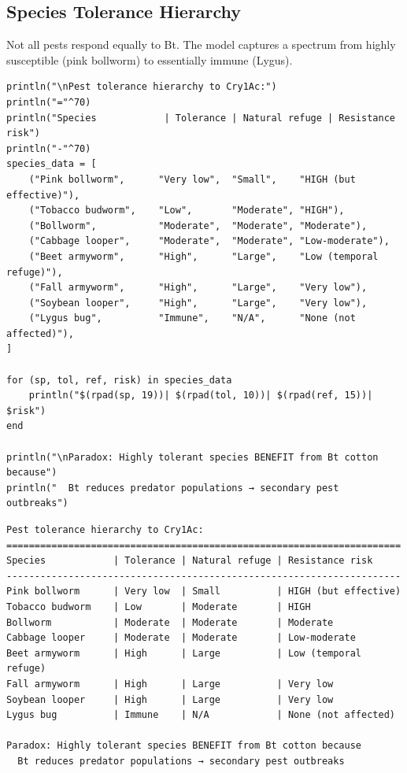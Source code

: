 \subsection{Species Tolerance Hierarchy}



\label{3927424312920648016}{}


Not all pests respond equally to Bt. The model captures a spectrum from highly susceptible (pink bollworm) to essentially immune (Lygus).




\begin{verbatim}
println("\nPest tolerance hierarchy to Cry1Ac:")
println("="^70)
println("Species            | Tolerance | Natural refuge | Resistance risk")
println("-"^70)
species_data = [
    ("Pink bollworm",      "Very low",  "Small",    "HIGH (but effective)"),
    ("Tobacco budworm",    "Low",       "Moderate", "HIGH"),
    ("Bollworm",           "Moderate",  "Moderate", "Moderate"),
    ("Cabbage looper",     "Moderate",  "Moderate", "Low-moderate"),
    ("Beet armyworm",      "High",      "Large",    "Low (temporal refuge)"),
    ("Fall armyworm",      "High",      "Large",    "Very low"),
    ("Soybean looper",     "High",      "Large",    "Very low"),
    ("Lygus bug",          "Immune",    "N/A",      "None (not affected)"),
]

for (sp, tol, ref, risk) in species_data
    println("$(rpad(sp, 19))| $(rpad(tol, 10))| $(rpad(ref, 15))| $risk")
end

println("\nParadox: Highly tolerant species BENEFIT from Bt cotton because")
println("  Bt reduces predator populations → secondary pest outbreaks")
\end{verbatim}




\begin{verbatim}
Pest tolerance hierarchy to Cry1Ac:
======================================================================
Species            | Tolerance | Natural refuge | Resistance risk
----------------------------------------------------------------------
Pink bollworm      | Very low  | Small          | HIGH (but effective)
Tobacco budworm    | Low       | Moderate       | HIGH
Bollworm           | Moderate  | Moderate       | Moderate
Cabbage looper     | Moderate  | Moderate       | Low-moderate
Beet armyworm      | High      | Large          | Low (temporal refuge)
Fall armyworm      | High      | Large          | Very low
Soybean looper     | High      | Large          | Very low
Lygus bug          | Immune    | N/A            | None (not affected)

Paradox: Highly tolerant species BENEFIT from Bt cotton because
  Bt reduces predator populations → secondary pest outbreaks
\end{verbatim}




